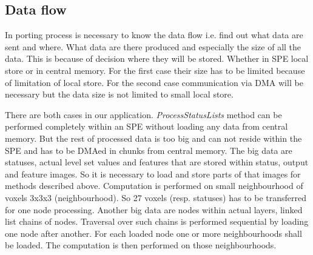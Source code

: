 \subsection{Data flow}

\par
In porting process is necessary to know the data flow i.e. find out what data are sent and where.
What data are there produced and especially the size of all the data.
This is because of decision where they will be stored.
Whether in SPE local store or in central memory.
For the first case their size has to be limited because of limitation of local store.
For the second case communication via DMA will be necessary but the data size is not limited to small local store.

\par
There are both cases in our application.
\mbox{\emph{ProcessStatusLists}} method can be performed completely within an SPE without loading any data from central memory.
But the rest of processed data is too big and can not reside within the SPE and has to be DMAed in chunks from central memory.
The big data are statuses, actual level set values and features that are stored within status, output and feature images.
So it is necessary to load and store parts of that images for methods described above.
Computation is performed on small neighbourhood of voxels 3x3x3 (neighbourhood).
So 27 voxels (resp. statuses) has to be transferred for one node processing.
Another big data are nodes within actual layers, linked list chains of nodes.
Traversal over such chains is performed sequential by loading one node after another.
For each loaded node one or more neighbourhoods shall be loaded.
The computation is then performed on those neighbourhoods.


